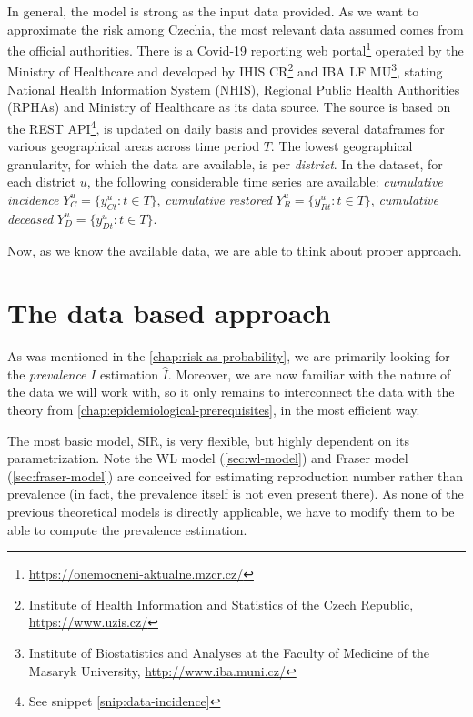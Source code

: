 \documentclass[
  digital, %
  oneside, %
  lof,     %
  lot,     %
]{fithesis4}
\begin{document}
In general, the model is strong as the input data provided.
As we want to approximate the risk among Czechia, the most 
relevant data assumed comes from the official authorities.
There is a Covid-19 reporting web 
portal\footnote{\url{https://onemocneni-aktualne.mzcr.cz/}} operated 
by the Ministry of Healthcare and developed by IHIS CR\footnote{Institute of Health Information and Statistics of the Czech Republic, \url{https://www.uzis.cz/}} 
and IBA LF MU\footnote{Institute of Biostatistics and Analyses at the Faculty of Medicine of the Masaryk University, \url{http://www.iba.muni.cz/}}, 
stating National Health Information System (NHIS), Regional Public 
Health Authorities (RPHAs) and Ministry of Healthcare as its 
data source. 
The source is based on the REST API\footnote{See snippet \ref{snip:data-incidence}}, 
is updated on daily basis and provides several 
dataframes for various geographical areas across time period $T$.
The lowest geographical granularity, for which the data are available, 
is per \textit{district}.
In the dataset, for each district $u$, the following considerable 
time series are available:
\textit{cumulative incidence} $Y_C^u = \{ y_{Ct}^u : t \in T \}$,
\textit{cumulative restored} $Y_R^u = \{ y_{R t}^u : t \in T \}$,
\textit{cumulative deceased} $Y_D^u = \{ y_{D t}^u : t \in T \}$.

Now, as we know the available data, we are able to think about 
proper approach.


\section{The data based approach}
\label{sec:data-based-approach}

As was mentioned in the \autoref{chap:risk-as-probability},
we are primarily looking for the \textit{prevalence} $I$ 
estimation $\hat{I}$. Moreover, we are now familiar with
the nature of the data we will work with, so it only remains
to interconnect the data with the theory from \autoref{chap:epidemiological-prerequisites},
in the most efficient way.

The most basic model, SIR, is very flexible, but highly dependent 
on its parametrization.
Note the WL model (\autoref{sec:wl-model}) and Fraser model
(\autoref{sec:fraser-model}) are conceived for
estimating reproduction number rather than prevalence
(in fact, the prevalence itself is not even present there).
As none of the previous theoretical models is directly applicable,
we have to modify them to be able to compute the prevalence
estimation.
\end{document}
